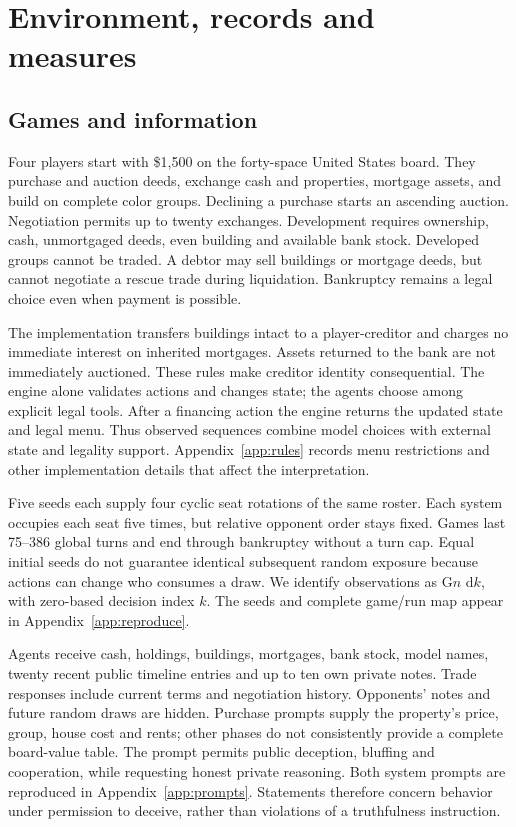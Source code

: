 \section{Environment, records and measures}
\label{sec:methods}
\subsection{Games and information}
Four players start with \$1,500 on the forty-space United States board. They purchase and auction deeds, exchange cash and properties, mortgage assets, and build on complete color groups. Declining a purchase starts an ascending auction. Negotiation permits up to twenty exchanges. Development requires ownership, cash, unmortgaged deeds, even building and available bank stock. Developed groups cannot be traded. A debtor may sell buildings or mortgage deeds, but cannot negotiate a rescue trade during liquidation. Bankruptcy remains a legal choice even when payment is possible.

The implementation transfers buildings intact to a player-creditor and charges no immediate interest on inherited mortgages. Assets returned to the bank are not immediately auctioned. These rules make creditor identity consequential. The engine alone validates actions and changes state; the agents choose among explicit legal tools. After a financing action the engine returns the updated state and legal menu. Thus observed sequences combine model choices with external state and legality support. Appendix~\ref{app:rules} records menu restrictions and other implementation details that affect the interpretation.

Five seeds each supply four cyclic seat rotations of the same roster. Each system occupies each seat five times, but relative opponent order stays fixed. Games last 75--386 global turns and end through bankruptcy without a turn cap. Equal initial seeds do not guarantee identical subsequent random exposure because actions can change who consumes a draw. We identify observations as G$n$ d$k$, with zero-based decision index $k$. The seeds and complete game/run map appear in Appendix~\ref{app:reproduce}.

Agents receive cash, holdings, buildings, mortgages, bank stock, model names, twenty recent public timeline entries and up to ten own private notes. Trade responses include current terms and negotiation history. Opponents' notes and future random draws are hidden. Purchase prompts supply the property's price, group, house cost and rents; other phases do not consistently provide a complete board-value table. The prompt permits public deception, bluffing and cooperation, while requesting honest private reasoning. Both system prompts are reproduced in Appendix~\ref{app:prompts}. Statements therefore concern behavior under permission to deceive, rather than violations of a truthfulness instruction.

